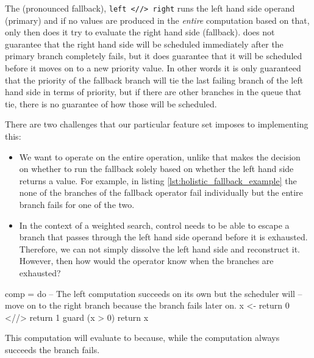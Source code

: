 The \hask{<//>} (pronounced fallback), \texttt{left <//> right} runs
the left hand side operand (primary) and if no values are produced in
the \emph{entire} computation based on that, only then does it try to
evaluate the right hand side (fallback).  does not
guarantee that the right hand side will be scheduled immediately after
the primary branch completely fails, but it does guarantee that it
will be scheduled before it moves on to a new priority value. In other
words it is only guaranteed that the priority of the fallback branch
will tie the last failing branch of the left hand side in terms of
priority, but if there are other branches in the queue that tie, there
is no guarantee of how those will be scheduled.

There are two challenges that our particular feature set imposes to
implementing this:

\begin{itemize}
\item We want \hask{<//>} to operate on the entire operation, unlike
  \cite{kiselyovBacktrackingInterleavingTerminating} that makes the
  decision on whether to run the fallback solely based on whether the
  left hand side returns a value. For example, in listing \ref{lst:holistic_fallback_example}
  the none of the branches of the fallback operator fail individually
  but the entire branch fails for one of the two.
\item In the context of a weighted search, control needs to be able to
  escape a branch that passes through the left hand side operand
  before it is exhausted. Therefore, we can not simply dissolve the
  left hand side and reconstruct it. However, then how would the operator
  know when the branches are exhausted?
\end{itemize}

\begin{code}
\begin{haskellcode}
comp = do
  -- The left computation succeeds on its own  but the scheduler will
  -- move on to the right branch because the branch fails later on.
  x <- return 0 <//> return 1
  guard (x > 0)
  return x
\end{haskellcode}
\caption{\label{lst:holistic_fallback_example}This computation will evaluate to  because, while the computation  always succeeds the branch fails.}
\end{code}

